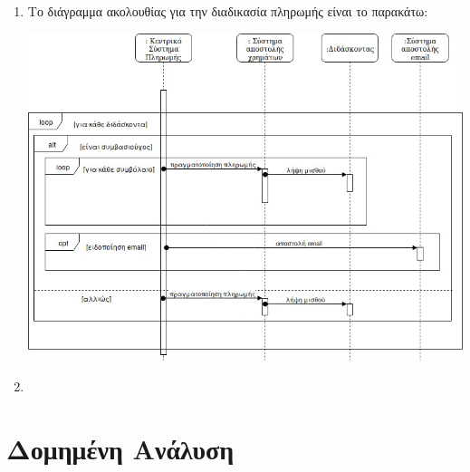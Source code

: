 \documentclass[12pt]{article}
\begin{document}
\begin{enumerate}
\item
Το διάγραμμα ακολουθίας για την διαδικασία πληρωμής είναι το παρακάτω:
\begin{center}
\includegraphics[scale=0.45]{sequence}
\end{center}

\newpage
\item
\end{enumerate}


\section{Δομημένη Ανάλυση}
\end{document}
